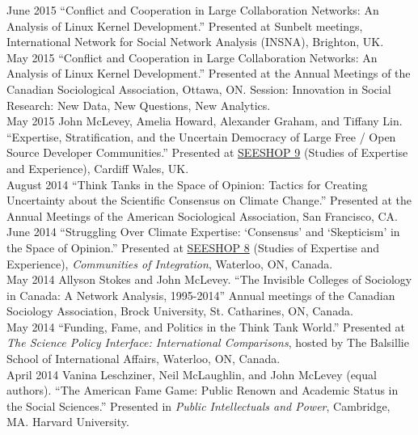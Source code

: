\documentclass[9pt,usenames,dvipsnames]{article}
\begin{document}
\ind June 2015 ``Conflict and Cooperation in Large Collaboration Networks: An Analysis of Linux Kernel Development.'' Presented at Sunbelt meetings, International Network for Social Network Analysis (INSNA), Brighton, UK. \\

\ind May 2015 ``Conflict and Cooperation in Large Collaboration Networks: An Analysis of Linux Kernel Development.'' Presented at the Annual Meetings of the Canadian Sociological Association, Ottawa, ON. Session: Innovation in Social Research: New Data, New Questions, New Analytics.\\

\ind May 2015 John McLevey, Amelia Howard, Alexander Graham, and Tiffany Lin. ``Expertise, Stratification, and the Uncertain Democracy of Large Free / Open Source Developer Communities.'' Presented at \href{http://www.cf.ac.uk/socsi/contactsandpeople/harrycollins/expertise-project/seeshophome.html}{SEESHOP 9} (Studies of Expertise and Experience), Cardiff Wales, UK. \\

\ind August 2014 ``Think Tanks in the Space of Opinion: Tactics for Creating Uncertainty about the Scientific Consensus on Climate Change.'' Presented at the Annual Meetings of the American Sociological Association, San Francisco, CA. \\

\ind June 2014 ``Struggling Over Climate Expertise: `Consensus' and `Skepticism' in the Space of Opinion.'' Presented at \href{http://www.cf.ac.uk/socsi/contactsandpeople/harrycollins/expertise-project/seeshophome.html}{SEESHOP 8} (Studies of Expertise and Experience), \emph{Communities of Integration}, Waterloo, ON, Canada. \\

\ind May 2014 Allyson Stokes and John McLevey. ``The Invisible Colleges of Sociology in Canada: A Network Analysis, 1995-2014'' Annual meetings of the Canadian Sociology Association, Brock University, St. Catharines, ON, Canada.\\

\ind May 2014 ``Funding, Fame, and Politics in the Think Tank World.'' Presented at \emph{The Science Policy Interface: International Comparisons}, hosted by The Balsillie School of International Affairs, Waterloo, ON, Canada. \\

\ind April 2014 Vanina Leschziner, Neil McLaughlin, and John McLevey (equal authors). ``The American Fame Game: Public Renown and Academic Status in the Social Sciences.'' Presented in \emph{Public Intellectuals and Power}, Cambridge, MA. Harvard University. \\
\end{document}
